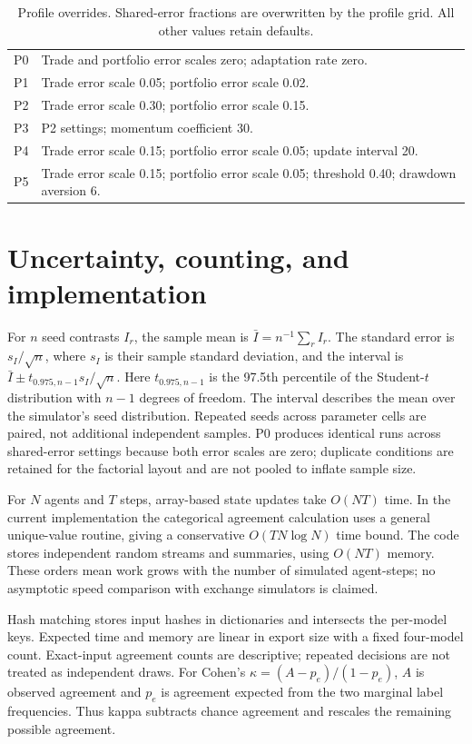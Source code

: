 \begin{table}[h]\centering
\caption{Profile overrides. Shared-error fractions are overwritten by the profile grid. All other values retain defaults.}
\begin{tabular}{lp{.72\linewidth}}\toprule
P0 & Trade and portfolio error scales zero; adaptation rate zero.\\
P1 & Trade error scale 0.05; portfolio error scale 0.02.\\
P2 & Trade error scale 0.30; portfolio error scale 0.15.\\
P3 & P2 settings; momentum coefficient 30.\\
P4 & Trade error scale 0.15; portfolio error scale 0.05; update interval 20.\\
P5 & Trade error scale 0.15; portfolio error scale 0.05; threshold 0.40; drawdown aversion 6.\\\bottomrule
\end{tabular}\end{table}

\section{Uncertainty, counting, and implementation}
For $n$ seed contrasts $I_r$, the sample mean is $\bar I=n^{-1}\sum_r I_r$. The standard error is $s_I/\sqrt n$, where $s_I$ is their sample standard deviation, and the interval is $\bar I\pm t_{0.975,n-1}s_I/\sqrt n$. Here $t_{0.975,n-1}$ is the 97.5th percentile of the Student-$t$ distribution with $n-1$ degrees of freedom. The interval describes the mean over the simulator's seed distribution. Repeated seeds across parameter cells are paired, not additional independent samples. P0 produces identical runs across shared-error settings because both error scales are zero; duplicate conditions are retained for the factorial layout and are not pooled to inflate sample size.

For $N$ agents and $T$ steps, array-based state updates take $O(NT)$ time. In the current implementation the categorical agreement calculation uses a general unique-value routine, giving a conservative $O(TN\log N)$ time bound. The code stores independent random streams and summaries, using $O(NT)$ memory. These orders mean work grows with the number of simulated agent-steps; no asymptotic speed comparison with exchange simulators is claimed.

Hash matching stores input hashes in dictionaries and intersects the per-model keys. Expected time and memory are linear in export size with a fixed four-model count. Exact-input agreement counts are descriptive; repeated decisions are not treated as independent draws. For Cohen's $\kappa=(A-p_e)/(1-p_e)$, $A$ is observed agreement and $p_e$ is agreement expected from the two marginal label frequencies. Thus kappa subtracts chance agreement and rescales the remaining possible agreement.

